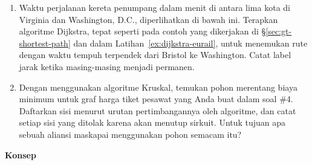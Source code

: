 \begin{enumerate}
\item \label{ex:dijkstra-warmup-rail}Waktu perjalanan kereta penumpang dalam menit di antara lima kota di Virginia dan Washington, D.C., diperlihatkan di bawah ini.  Terapkan algoritme Dijkstra, tepat seperti pada contoh yang dikerjakan di \S\ref{sec:gt-shortest-path} dan dalam Latihan~\ref{ex:dijkstra-eurail}, untuk menemukan rute dengan waktu tempuh terpendek dari Bristol ke Washington.  Catat label jarak ketika masing-masing menjadi permanen.\\

\par{}\label{fig:graphtheory-dor1-tikz50}%


\item \label{ex:kruskal-airfare}Dengan menggunakan algoritme Kruskal, temukan pohon merentang biaya minimum untuk graf harga tiket pesawat yang Anda buat dalam soal \#4.  Daftarkan sisi menurut urutan pertimbangannya oleh algoritme, dan catat setiap sisi yang ditolak karena akan menutup sirkuit.  Untuk tujuan apa sebuah aliansi maskapai menggunakan pohon semacam itu?
\exrefs{\S\ref{subsec:gt-kruskal}}
\end{enumerate}

\noindent \textbf{Konsep}

